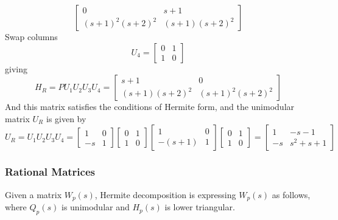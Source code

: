 \begin{example}
\begin{equation*}
\begin{bmatrix}
      0 & s+1 \\
      (s+1)^{2}(s+2)^{2} & (s+1)(s+2)^{2}
    \end{bmatrix}
  \end{equation*}
  Swap columns
  \begin{equation*}
    U_{4}=
    \begin{bmatrix}
      0 & 1 \\
      1 & 0
    \end{bmatrix}
  \end{equation*}
  giving
  \begin{equation*}
    H_{R}=
    PU_{1}U_{2}U_{3}U_{4}=
    \begin{bmatrix}
      s+1 & 0 \\
       (s+1)(s+2)^{2} & (s+1)^{2}(s+2)^{2}
    \end{bmatrix}
  \end{equation*}
  And this matrix satisfies the conditions of Hermite form, and the unimodular matrix $U_{R}$ is given by
  \begin{equation*}
    U_{R}=
    U_{1}U_{2}U_{3}U_{4}=
    \begin{bmatrix}
      1 & 0 \\
      -s & 1
    \end{bmatrix}
    \begin{bmatrix}
      0 & 1 \\
      1 & 0
    \end{bmatrix}
    \begin{bmatrix}
      1 & 0 \\
      -(s+1) & 1
    \end{bmatrix}
    \begin{bmatrix}
      0 & 1 \\
      1 & 0
    \end{bmatrix}
    =
    \begin{bmatrix}
      1 & -s-1 \\
      -s & s^{2}+s+1
    \end{bmatrix}
  \end{equation*}
\end{example}

\subsubsection{Rational Matrices}

Given a matrix $W_{p}(s)$, Hermite decomposition is expressing $W_{p}(s)$ as follows, where $Q_{p}(s)$ is unimodular and $H_{p}(s)$ is lower triangular.

